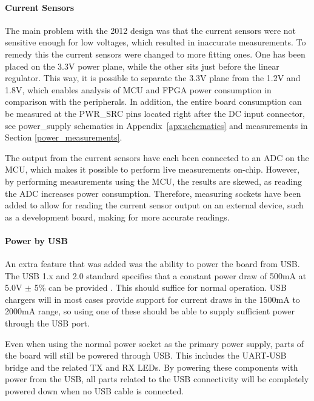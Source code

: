 \paragraph{Current Sensors} \label{psu:current_sensors}

The main problem with the 2012 design was that the current sensors were not
sensitive enough for low voltages, which resulted in inaccurate measurements. To
remedy this the current sensors were changed to more fitting ones. One has been
placed on the 3.3V power plane, while the other sits just before the linear
regulator. This way, it is possible to separate the 3.3V plane from the 1.2V and
1.8V, which enables analysis of MCU and FPGA power consumption in comparison
with the peripherals. In addition, the entire board consumption can be measured
at the PWR\_SRC pins located right after the DC input connector, see power\_supply schematics in Appendix~\ref{apx:schematics} and measurements in Section \ref{power_measurements}.

The output from the current sensors have each been connected to an ADC on the
MCU, which makes it possible to perform live measurements on-chip. However, by
performing measurements using the MCU, the results are skewed, as reading the
ADC increases power consumption. Therefore, measuring sockets have been added to
allow for reading the current sensor output on an external device, such as a
development board, making for more accurate readings.

\paragraph{Power by USB} \label{psu:usb}

An extra feature that was added was the ability to power the board from USB. The
USB 1.x and 2.0 standard specifies that a constant power draw of 500mA at 5.0V
$\pm$ 5\% can be provided \cite{usb}. This should suffice for
normal operation. USB chargers will in most cases provide support for current
draws in the 1500mA to 2000mA range, so using one of these should be able to
supply sufficient power through the USB port.

Even when using the normal power socket as the primary power supply, parts of
the board will still be powered through USB. This includes the UART-USB bridge
and the related TX and RX LEDs. By powering these components with power from the
USB, all parts related to the USB connectivity will be completely powered down
when no USB cable is connected.
